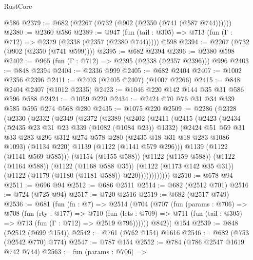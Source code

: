 \begin{lexlean}{RustCore}
\begin{coremodule}
    @586
@2379 := @682 (@2267 (@732 (@902 (@2350 (@741 (@587 @744))))))
@2380 := @2360 @586
@2389 := @947
    (fun (tail : @305) => @713 (fun (Γ : @712) => @2379 (@2338 (@2357 (@2380 @744)))))
    @598
@2394 := @2267 (@732 (@902 (@2350 (@741 @599))))
@2395 := @682 @2394
@2396 := @2380 @598
@2402 := @965 (fun (Γ : @712) => @2395 (@2338 (@2357 @2396))) @996
@2403 := @848 @2394
@2404 := @2336 @999
@2405 := @682 @2404
@2407 := @1002 @2356 @2396
@2411 := @2403 (@2405 @2407) (@1007 @2266)
@2415 := @848 @2404 @2407 (@1012 @2335)
@2423 := @1046 @220 @142 @144 @35 @31 @586 @596 @588
@2424 := @1059 @220
@2434 := @2424 @70 @76 @31 @34 @339 @585 @595 @274 @568 @280
@2435 := @1075 @220
@2509 := @2286
    (@2328
      (@2330
        (@2332
          (@2349
            (@2372
              (@2389
                (@2402
                  (@2411
                    (@2415
                      (@2423
                        (@2434
                          (@2435 @23 @31 @23 @339 (@1082 (@1084 @23)) @1332)
                          (@2424
                            @51
                            @59
                            @31
                            @33
                            @283
                            @296
                            @312
                            @274
                            @578
                            @280
                            (@2435 @18 @31 @18 @283 @1086 @1093)
                            (@1134 @220)
                            @1139
                            (@1122 (@1141 @579 @296)))
                          @1139
                          (@1122 (@1141 @569 @585)))
                        (@1154 (@1155 @588))
                        (@1122 (@1159 @588))
                        (@1122 (@1164 @588))
                        (@1122 (@1168 @588 @35))
                        (@1122 (@1173 @142 @35 @31))
                        (@1122 (@1179 (@1180 (@1181 @588)) @220))))))))))))
@2510 := @678 @94
@2511 := @696 @94
@2512 := @686 @2511
@2514 := @682 (@2512 @701)
@2516 := @724 (@725 @94)
@2517 := @720 @2516
@2519 := @682 (@2517 @749)
@2536 := @681
    (fun (fn : @7) =>
    @2514
      (@704
        (@707
          (fun (params : @706) =>
          @708
            (fun (rty : @177) =>
            @710
              (fun (lets : @709) =>
              @711 (fun (tail : @305) => @713 (fun (Γ : @712) => @2519 @796))))))
        @842))
    @154
@2539 := @848 (@2512 (@699 @154))
@2542 := @761 (@762 @154) @1616
@2546 := @682 (@753 (@2542 @770) @774)
@2547 := @787 @154
@2552 := @784 (@786 @2547 @1619 @742 @744)
@2563 := fun (params : @706) =>

\end{coremodule}
\end{lexlean}
